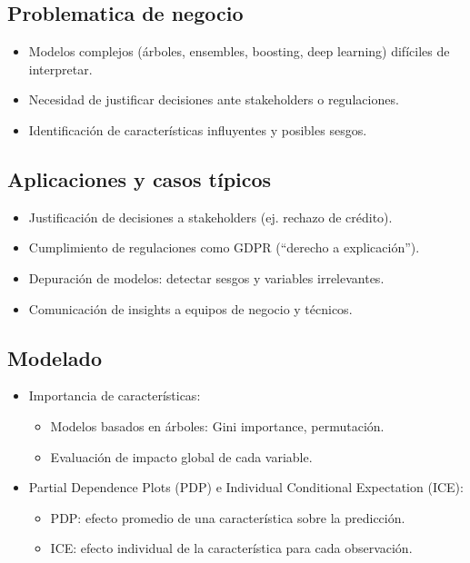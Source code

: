 \documentclass[12pt,a4paper,openany,oneside]{book}
\begin{document}
\begin{itemize}
\subsection{Problematica de negocio}
\begin{itemize}
    \item Modelos complejos (árboles, ensembles, boosting, deep learning) difíciles de interpretar.
    \item Necesidad de justificar decisiones ante stakeholders o regulaciones.
    \item Identificación de características influyentes y posibles sesgos.
\end{itemize}

\subsection{Aplicaciones y casos típicos}
\begin{itemize}
    \item Justificación de decisiones a stakeholders (ej. rechazo de crédito).
    \item Cumplimiento de regulaciones como GDPR (“derecho a explicación”).
    \item Depuración de modelos: detectar sesgos y variables irrelevantes.
    \item Comunicación de insights a equipos de negocio y técnicos.
\end{itemize}

\subsection{Modelado}
\begin{itemize}
    \item Importancia de características:
    \begin{itemize}
        \item Modelos basados en árboles: Gini importance, permutación.
        \item Evaluación de impacto global de cada variable.
    \end{itemize}
    
    \item Partial Dependence Plots (PDP) e Individual Conditional Expectation (ICE):
    \begin{itemize}
        \item PDP: efecto promedio de una característica sobre la predicción.
        \item ICE: efecto individual de la característica para cada observación.
    \end{itemize}
    

\end{itemize}
\end{itemize}
\end{document}
